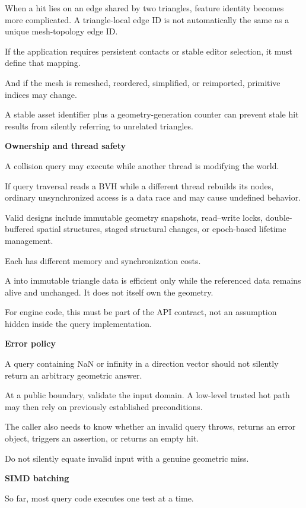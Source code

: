 When a hit lies on an edge shared by two triangles, feature identity becomes more complicated. A triangle-local edge ID is not automatically the same as a unique mesh-topology edge ID.

If the application requires persistent contacts or stable editor selection, it must define that mapping.

And if the mesh is remeshed, reordered, simplified, or reimported, primitive indices may change.

A stable asset identifier plus a geometry-generation counter can prevent stale hit results from silently referring to unrelated triangles.

\textbf{Ownership and thread safety}

A collision query may execute while another thread is modifying the world.

If query traversal reads a BVH while a different thread rebuilds its nodes, ordinary unsynchronized access is a data race and may cause undefined behavior.

Valid designs include immutable geometry snapshots, read--write locks, double-buffered spatial structures, staged structural changes, or epoch-based lifetime management.

Each has different memory and synchronization costs.

A  into immutable triangle data is efficient only while the referenced data remains alive and unchanged. It does not itself own the geometry.

For engine code, this must be part of the API contract, not an assumption hidden inside the query implementation.

\textbf{Error policy}

A query containing NaN or infinity in a direction vector should not silently return an arbitrary geometric answer.

At a public boundary, validate the input domain. A low-level trusted hot path may then rely on previously established preconditions.

The caller also needs to know whether an invalid query throws, returns an error object, triggers an assertion, or returns an empty hit.

Do not silently equate invalid input with a genuine geometric miss.

\textbf{SIMD batching}

So far, most query code executes one test at a time.


